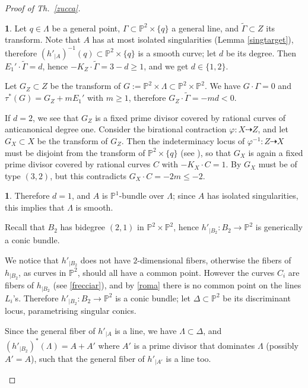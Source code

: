 \documentclass[a4paper,12pt]{amsart}
\theoremstyle{definition}
\newtheorem{prg}[thm]{}
\numberwithin{figure}{section}
\numberwithin{table}{section}
\newcommand{\ph}{\varphi}
\newcommand{\w}{\widetilde}
\newcommand{\pr}{\mathbb{P}}
\begin{document}
\begin{proof}[Proof of Th.~\ref{zucca}]
\begin{prg}
Let $q\in\Lambda$ be a general point, $\Gamma\subset \pr^2\times\{q\}$ a general line, and $\w{\Gamma}\subset Z$ its transform. Note that $A$ has at most isolated singularities (Lemma \ref{singtarget}), therefore $(h'_{|A})^{-1}(q)\subset\pr^2\times\{q\}$ is a smooth curve; let $d$ be its degree.
Then $E_1'\cdot\w{\Gamma}=d$, hence $-K_Z\cdot\w{\Gamma}=3-d\geq 1$, and  we get $d\in\{1,2\}$.

  Let $G_Z\subset Z$ be the transform of $G:=\pr^2\times\Lambda\subset\pr^2\times\pr^2$. We have
  $G\cdot \Gamma=0$ and $\tau^*(G)=G_Z+mE_1'$ with $m\geq 1$, therefore $G_Z\cdot\w{\Gamma}=-md<0$.

  If $d=2$, we see that $G_Z$ is a fixed prime divisor covered by rational curves of anticanonical degree one. Consider the birational contraction $\ph\colon X\dasharrow Z$, and let $G_X\subset X$ be the transform of $G_Z$. Then the indeterminacy locus of $\ph^{-1}\colon Z\dasharrow X$ must be disjoint from the transform of $\pr^2\times\{q\}$ (see \cite[Prop.~2.10]{3folds}), so that $G_X$ 
  is again a fixed prime divisor covered by rational curves $C$ with $-K_X\cdot C=1$. By \cite[Lemma 2.18]{blowup} $G_X$ must be of type $(3,2)$, but this contradicts  $G_X\cdot C=-2m\leq -2$.
\end{prg}
\begin{prg}\label{lambda}
  Therefore $d=1$, and $A$ is $\pr^1$-bundle over $\Lambda$; since $A$ has isolated singularities, this implies that
  $\Lambda$ is smooth.
  
Recall that $B_2$ has bidegree $(2,1)$ in $\pr^2\times\pr^2$,
hence  $h'_{|B_2}\colon B_2\to\pr^2$ is generically a conic bundle.

We notice that $h'_{|B_2}$ does not have $2$-dimensional fibers, otherwise the fibers of $h_{|B_2}$, as curves in $\pr^2$, should all have a common point.  However the curves $C_i$ are fibers of $h_{|B_2}$ (see \ref{frecciar}), and 
by \ref{roma} there is no common point on the lines $L_i$'s. Therefore $h'_{|B_2}\colon B_2\to \pr^2$ is  a conic bundle; let $\Delta\subset\pr^2$ be its discriminant locus, parametrising singular conics.

Since the general fiber of $h'_{|A}$ is a line, we have $\Lambda\subset\Delta$, and $(h'_{|B_2})^*(\Lambda)=A+A'$ where $A'$ is a prime divisor that dominates $\Lambda$ (possibly $A'=A$), such that the general fiber of $h'_{|A'}$ is a line too.


\end{prg}
\end{proof}
\end{document}
